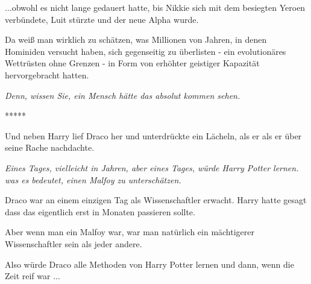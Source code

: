 ...obwohl es nicht lange gedauert hatte, bis Nikkie sich mit dem besiegten
Yeroen verbündete, Luit stürzte und der neue Alpha wurde.

Da weiß man wirklich zu schätzen, was Millionen von Jahren, in denen Hominiden
versucht haben, sich gegenseitig zu überlisten - ein evolutionäres Wettrüsten
ohne Grenzen - in Form von erhöhter geistiger Kapazität hervorgebracht hatten.

\emph{Denn, wissen Sie, ein Mensch hätte das absolut kommen sehen.}

\begin{center}*****\end{center}

Und neben Harry lief Draco her und unterdrückte ein Lächeln, als er als er über
seine Rache nachdachte.

\emph{Eines Tages, vielleicht in Jahren, aber eines Tages, würde Harry Potter
lernen. was es bedeutet, einen Malfoy zu unterschätzen.}

Draco war an einem einzigen Tag als Wissenschaftler erwacht. Harry hatte gesagt
dass das eigentlich erst in Monaten passieren sollte.

Aber wenn man ein Malfoy war, war man natürlich ein mächtigerer Wissenschaftler
sein als jeder andere.

Also würde Draco alle Methoden von Harry Potter lernen und dann, wenn die Zeit
reif war ...
